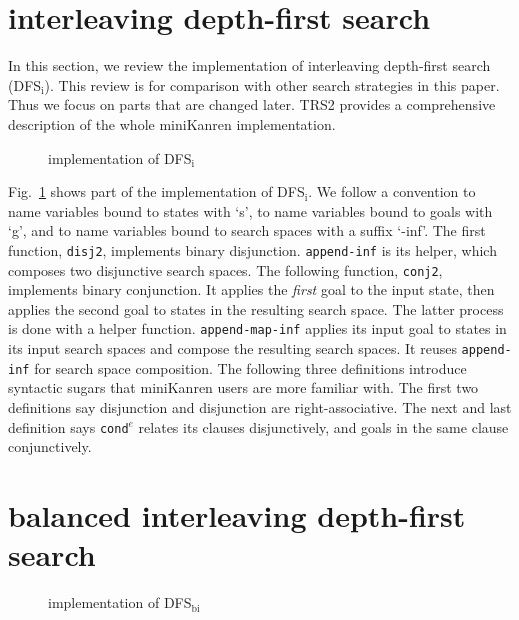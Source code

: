 \documentclass[format=acmlarge, review=true, authordraft=true]{acmart}
\newcommand{\conde}{\texttt{cond$^e$}}
\newcommand{\DFSi }[0]{DFS$_\textrm{i}$}
\newcommand{\DFSbi}[0]{DFS$_\textrm{bi}$}
\begin{document}
\section{interleaving depth-first search}

In this section, we review the implementation of interleaving depth-first 
search 
(\DFSi). This review is for comparison with other search strategies in this 
paper. Thus we focus on parts that are changed later. TRS2 
\citep{friedman_reasoned_2018} provides a comprehensive description of the 
whole miniKanren implementation.

\begin{figure}
    
    \caption{implementation of \DFSi}
    \label{DFSi}
\end{figure}

Fig.~\ref{DFSi} shows part of the implementation of \DFSi{}. We follow a
convention to name variables bound to states with `s', to name variables bound 
to goals with `g', and to name variables bound to search spaces with a suffix 
`-inf'. The first function, \texttt{disj2}, implements binary disjunction. 
\texttt{append-inf} is its helper, which composes two disjunctive search 
spaces. 
The following function, \texttt{conj2}, implements binary conjunction. It 
applies 
the \emph{first} goal to the input state, then applies the second goal to 
states in the resulting search space. The latter process is done with a helper 
function. \texttt{append-map-inf} applies its input goal to states in its input 
search spaces and compose the resulting search spaces. It reuses 
\texttt{append-inf} for search space composition. The following three 
definitions introduce syntactic sugars that miniKanren users are more familiar 
with. The first two definitions say disjunction and disjunction are 
right-associative. The next and last definition says \conde{} relates its 
clauses disjunctively, and goals in the same clause conjunctively.

\section{balanced interleaving depth-first search}

\begin{figure}
	
	\caption{implementation of \DFSbi{}}
	\label{balanced-disj}
\end{figure}
\end{document}
